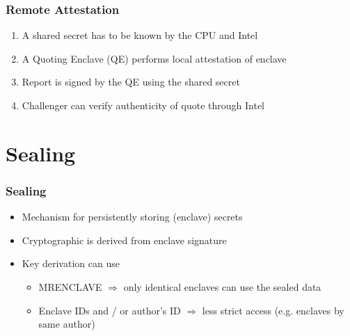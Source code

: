 
\begin{frame}
    \frametitle{Remote Attestation}
    \begin{enumerate}[<+->]
        \item A shared secret has to be known by the CPU and Intel
        \item A Quoting Enclave (QE) performs local attestation of enclave
        \item Report is signed by the QE using the shared secret
        \item Challenger can verify authenticity of quote through Intel
    \end{enumerate}
\end{frame}


\section{Sealing}

\begin{frame}
    \frametitle{Sealing}
    \begin{itemize}[<+->]
        \item Mechanism for persistently storing (enclave) secrets
        \item Cryptographic is derived from enclave signature
        \item Key derivation can use
        \begin{itemize}
            \item MRENCLAVE $\Rightarrow$ only identical enclaves can use the sealed data
            \item Enclave IDs and / or author's ID $\Rightarrow$ less strict access (e.g. enclaves by same author)
        \end{itemize}
    \end{itemize}
\end{frame}
